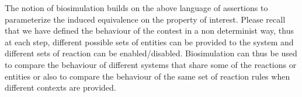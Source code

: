 The notion of biosimulation builds on the above language of assertions to parameterize the induced equivalence on the property of interest. 
Please recall that we have defined the behaviour of the contest in a non determinist way, thus 
at each step, different possible sets of entities can be provided to the system and different sets of reaction can be enabled/disabled. 
Biosimulation can thus be used to compare the behaviour of different systems that share some of the reactions or entities or also to compare the behaviour of the same set of reaction rules when different contexts are provided.



%
%
%





